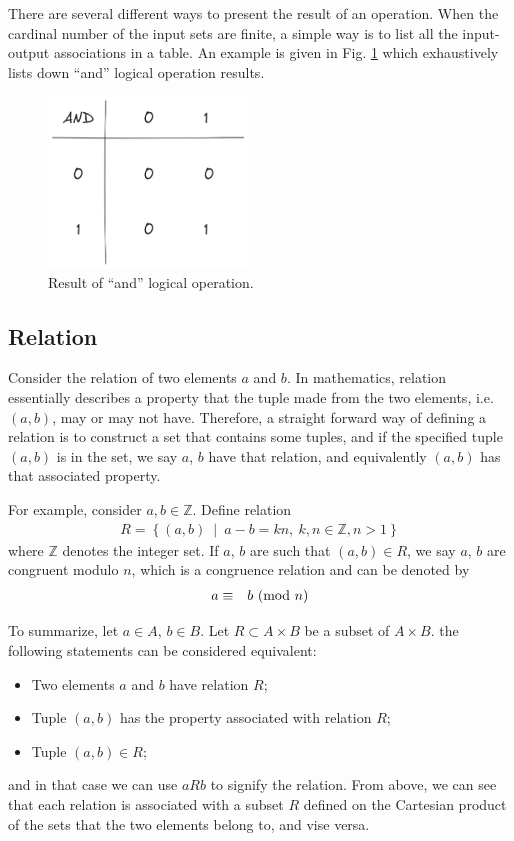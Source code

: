 There are several different ways to present the result of an operation. When the cardinal number of the input sets are finite, a simple way is to list all the input-output associations in a table. An example is given in Fig. \ref{fig:logical_and_mapping} which exhaustively lists down ``and'' logical operation results.
\begin{figure}[htbp]
	\centering
	\includegraphics[width=150pt]{chapters/abstract-algebra-basics/figures/logical_and_mapping.png}
	\caption{Result of ``and'' logical operation.} \label{fig:logical_and_mapping}
\end{figure}

\subsection{Relation}

Consider the relation of two elements $a$ and $b$. In mathematics, relation essentially describes a property that the tuple made from the two elements, i.e. $(a,b)$, may or may not have. Therefore, a straight forward way of defining a relation is to construct a set that contains some tuples, and if the specified tuple $(a,b)$ is in the set, we say $a$, $b$ have that relation, and equivalently $(a,b)$ has that associated property.

For example, consider $a,b\in\mathbb{Z}$. Define relation
\begin{eqnarray}
	R = \left\{(a,b)~\middle|~a-b = kn,~k,n \in\mathbb{Z}, n>1\right\}
\end{eqnarray}
where $\mathbb{Z}$ denotes the integer set. If $a$, $b$ are such that $(a,b)\in R$, we say $a$, $b$ are congruent modulo $n$, which is a congruence relation and can be denoted by
\begin{eqnarray}
	a &\equiv& b~(\textup{mod}~n) \nonumber
\end{eqnarray}

To summarize, let $a\in A$, $b\in B$. Let $R\subset A\times B$ be a subset of $A\times B$. the following statements can be considered equivalent:
\begin{itemize}
	\item Two elements $a$ and $b$ have relation $R$;
	\item Tuple $(a,b)$ has the property associated with relation $R$;
	\item Tuple $(a,b) \in R$;
\end{itemize}
and in that case we can use $aRb$ to signify the relation. From above, we can see that each relation is associated with a subset $R$ defined on the Cartesian product of the sets that the two elements belong to, and vise versa.

